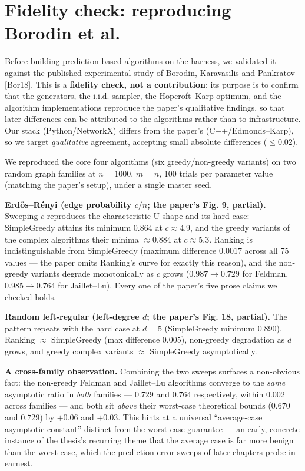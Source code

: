 \section{Fidelity check: reproducing Borodin et al.}\label{fidelity-check-reproducing-borodin-et-al.}

Before building prediction-based algorithms on the harness, we validated it against the
published experimental study of Borodin, Karavasilis and Pankratov {[}Bor18{]}. This is a
\textbf{fidelity check, not a contribution}: its purpose is to confirm that the generators, the
i.i.d. sampler, the Hopcroft--Karp optimum, and the algorithm implementations reproduce the
paper's qualitative findings, so that later differences can be attributed to the algorithms
rather than to infrastructure. Our stack (Python/NetworkX) differs from the paper's
(C++/Edmonds--Karp), so we target \emph{qualitative} agreement, accepting small absolute
differences (\(\le 0.02\)).

We reproduced the core four algorithms (six greedy/non-greedy variants) on two random graph
families at \(n=1000\), \(m=n\), 100 trials per parameter value (matching the paper's setup),
under a single master seed.

\textbf{Erdős--Rényi (edge probability \(c/n\); the paper's Fig. 9, partial).} Sweeping \(c\)
reproduces the characteristic U-shape and its hard case: SimpleGreedy attains its minimum
\(0.864\) at \(c\approx4.9\), and the greedy variants of the complex algorithms their minima
\(\approx0.884\) at \(c\approx5.3\). Ranking is indistinguishable from SimpleGreedy (maximum
difference \(0.0017\) across all 75 values --- the paper omits Ranking's curve for exactly this
reason), and the non-greedy variants degrade monotonically as \(c\) grows (\(0.987\to0.729\) for
Feldman, \(0.985\to0.764\) for Jaillet--Lu). Every one of the paper's five prose claims we
checked holds.

\textbf{Random left-regular (left-degree \(d\); the paper's Fig. 18, partial).} The pattern
repeats with the hard case at \(d=5\) (SimpleGreedy minimum \(0.890\)), Ranking \(\approx\)
SimpleGreedy (max difference \(0.005\)), non-greedy degradation as \(d\) grows, and greedy
complex variants \(\approx\) SimpleGreedy asymptotically.

\textbf{A cross-family observation.} Combining the two sweeps surfaces a non-obvious fact: the
non-greedy Feldman and Jaillet--Lu algorithms converge to the \emph{same} asymptotic ratio in
\emph{both} families --- \(0.729\) and \(0.764\) respectively, within \(0.002\) across families --- and
both sit \emph{above} their worst-case theoretical bounds (\(0.670\) and \(0.729\)) by \(+0.06\) and
\(+0.03\). This hints at a universal ``average-case asymptotic constant'' distinct from the
worst-case guarantee --- an early, concrete instance of the thesis's recurring theme that the
average case is far more benign than the worst case, which the prediction-error sweeps of
later chapters probe in earnest.

